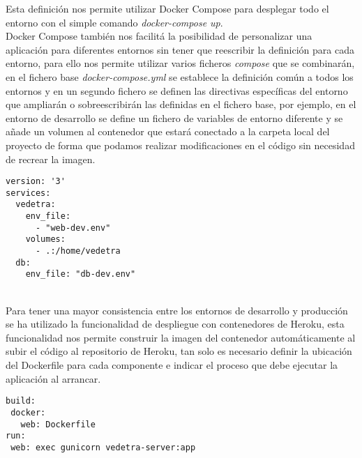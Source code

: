 \documentclass[../proyecto.tex]{subfiles}
\begin{document}
Esta definición nos permite utilizar Docker Compose para desplegar todo el entorno con el simple comando \textit{docker-compose up}.\\

Docker Compose también nos facilitá la posibilidad de personalizar una aplicación para  diferentes entornos sin tener que reescribir la definición para cada entorno, para ello nos permite utilizar varios ficheros \textit{compose} que se combinarán, en el fichero base \textit{docker-compose.yml} se establece la definición común a todos los entornos y en un segundo fichero se definen las directivas específicas del entorno que ampliarán o sobreescribirán las definidas en el fichero base, por ejemplo, en el entorno de desarrollo se define un fichero de variables de entorno diferente y se añade un volumen al contenedor que estará conectado a la carpeta local del proyecto de forma que podamos realizar modificaciones en el código sin necesidad de recrear la imagen.\\

\begin{minipage}{\linewidth}
\begin{lstlisting}[caption=Fichero docker-compose.yml para el entorno de desarrollo, captionpos=b, frame=single]
version: '3'
services:
  vedetra:
    env_file:
      - "web-dev.env"
    volumes:
      - .:/home/vedetra
  db:
    env_file: "db-dev.env"
\end{lstlisting}
\end{minipage}

\\

Para tener una mayor consistencia entre los entornos de desarrollo y producción se ha utilizado la funcionalidad de despliegue con contenedores de Heroku, esta funcionalidad nos permite construir la imagen del contenedor automáticamente al subir el código al repositorio de Heroku, tan solo es necesario definir la ubicación del Dockerfile para cada componente e indicar el proceso que debe ejecutar la aplicación al arrancar.\\

\begin{minipage}{\linewidth}
\begin{lstlisting}[caption=Definición de aplicación de Heroku, captionpos=b, frame=single]
build:
 docker:
   web: Dockerfile
run:
 web: exec gunicorn vedetra-server:app
\end{lstlisting}
\end{minipage}
\end{document}
